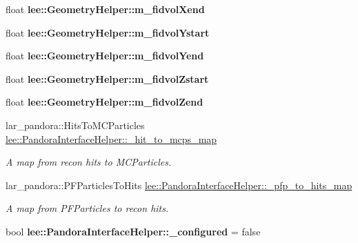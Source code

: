 \begin{DoxyCompactItemize}
\item 
\hypertarget{group__lee_ga65a7d75c7b48384cf068e8336c6b8d55}{float {\bfseries lee\-::\-Geometry\-Helper\-::m\-\_\-fidvol\-Xend}}\label{group__lee_ga65a7d75c7b48384cf068e8336c6b8d55}

\item 
\hypertarget{group__lee_ga7a6451c1fc8cbf3d473820d3a63e2011}{float {\bfseries lee\-::\-Geometry\-Helper\-::m\-\_\-fidvol\-Ystart}}\label{group__lee_ga7a6451c1fc8cbf3d473820d3a63e2011}

\item 
\hypertarget{group__lee_ga264c826fdc8dff5cee93435d0e7391db}{float {\bfseries lee\-::\-Geometry\-Helper\-::m\-\_\-fidvol\-Yend}}\label{group__lee_ga264c826fdc8dff5cee93435d0e7391db}

\item 
\hypertarget{group__lee_gab0846ac674a2c392a95f7e3c36ee5981}{float {\bfseries lee\-::\-Geometry\-Helper\-::m\-\_\-fidvol\-Zstart}}\label{group__lee_gab0846ac674a2c392a95f7e3c36ee5981}

\item 
\hypertarget{group__lee_ga33ed7b1dc9f343d6f048ab67e69ab567}{float {\bfseries lee\-::\-Geometry\-Helper\-::m\-\_\-fidvol\-Zend}}\label{group__lee_ga33ed7b1dc9f343d6f048ab67e69ab567}

\item 
\hypertarget{group__lee_gadd430a976fa40632e14eb1688cdd785b}{lar\-\_\-pandora\-::\-Hits\-To\-M\-C\-Particles \hyperlink{group__lee_gadd430a976fa40632e14eb1688cdd785b}{lee\-::\-Pandora\-Interface\-Helper\-::\-\_\-hit\-\_\-to\-\_\-mcps\-\_\-map}}\label{group__lee_gadd430a976fa40632e14eb1688cdd785b}

\begin{DoxyCompactList}\small\item\em A map from recon hits to M\-C\-Particles. \end{DoxyCompactList}\item 
\hypertarget{group__lee_gae19df94cb2c29dc2735bf7436c5ccf63}{lar\-\_\-pandora\-::\-P\-F\-Particles\-To\-Hits \hyperlink{group__lee_gae19df94cb2c29dc2735bf7436c5ccf63}{lee\-::\-Pandora\-Interface\-Helper\-::\-\_\-pfp\-\_\-to\-\_\-hits\-\_\-map}}\label{group__lee_gae19df94cb2c29dc2735bf7436c5ccf63}

\begin{DoxyCompactList}\small\item\em A map from P\-F\-Particles to recon hits. \end{DoxyCompactList}\item 
\hypertarget{group__lee_ga2adc9100d7afd42201e3b158c537231c}{bool {\bfseries lee\-::\-Pandora\-Interface\-Helper\-::\-\_\-configured} = false}\label{group__lee_ga2adc9100d7afd42201e3b158c537231c}


\end{DoxyCompactItemize}
